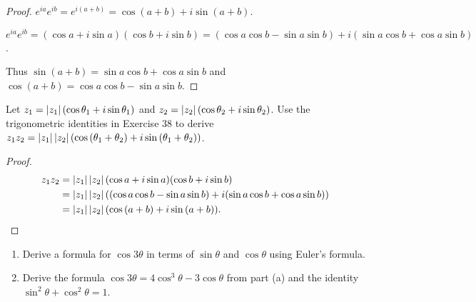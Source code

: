 \begin{proof}
    $e^{ia}e^{ib} = e^{i(a+b)} = \cos(a+b) + i\sin(a+b)$.

    $e^{ia}e^{ib} = (\cos a + i\sin a)(\cos b + i\sin b) = (\cos a\cos b - \sin a\sin b) + i(\sin a\cos b + \cos a\sin b)$.

    Thus $\sin(a + b) = \sin a\cos b + \cos a\sin b$ and $\cos(a + b) = \cos a\cos b - \sin a\sin b$.
\end{proof}

\begin{exercise}
    Let $z_{1} = \left\vert{z_{1}}\right\vert(\cos{\theta_{1}} + i\sin{\theta_{1}})$ and $z_{2} = \left\vert{z_{2}}\right\vert(\cos{\theta_{2}} + i\sin{\theta_{2}})$. Use the trigonometric identities in Exercise 38 to derive $z_{1}z_{2} = \left\vert{z_{1}}\right\vert\left\vert{z_{2}}\right\vert(\cos{(\theta_{1} + \theta_{2})} + i\sin{(\theta_{1} + \theta_{2})})$.
\end{exercise}

\begin{proof}
    \begin{align*}
        z_{1}z_{2} & = \left\vert{z_{1}}\right\vert\left\vert{z_{2}}\right\vert(\cos a + i\sin a)(\cos b + i\sin b)                             \\
                   & = \left\vert{z_{1}}\right\vert\left\vert{z_{2}}\right\vert((\cos a\cos b - \sin a\sin b) + i(\sin a\cos b + \cos a\sin b)) \\
                   & = \left\vert{z_{1}}\right\vert\left\vert{z_{2}}\right\vert(\cos{(a+b)} + i\sin{(a+b)}).
    \end{align*}
\end{proof}

\begin{exercise}
    \begin{enumerate}[topsep=0pt,itemsep=0pt,label={\textbf{\alph*.}}]
        \item Derive a formula for $\cos{3\theta}$ in terms of $\sin{\theta}$ and $\cos{\theta}$ using Euler's formula.
        \item Derive the formula $\cos{3\theta} = 4\cos^{3}{\theta} - 3\cos{\theta}$ from part (a) and the identity $\sin^{2}{\theta} + \cos^{2}{\theta} = 1$.
    \end{enumerate}
\end{exercise}

